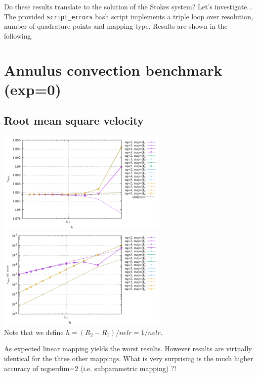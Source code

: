 Do these results translate to the solution of the Stokes system? Let's investigate...
The provided {\tt script\_errors} bash script implements a triple loop 
over resolution, number of quadrature points and mapping type.
Results are shown in the following.

\newpage
\section*{Annulus convection benchmark (exp=0)}

\subsection*{Root mean square velocity}

\begin{center}
\includegraphics[width=8.3cm]{python_codes/fieldstone_152/results/exp0/vrms}
\includegraphics[width=8.3cm]{python_codes/fieldstone_152/results/exp0/vrms_error}\\
{\captionfont Note that we define $h=(R_2-R_1)/nelr=1/nelr$.}
\end{center}

As expected linear mapping yields the worst results. However results are virtually identical for 
the three other mappings.
What is very surprising is the much higher accuracy of {\python nqperdim=2} (i.e. subparametric mapping) ?!


